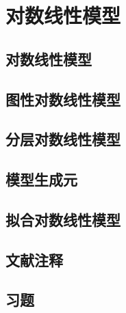 \chapter{对数线性模型}

\section{对数线性模型}

\pending

\section{图性对数线性模型}

\pending

\section{分层对数线性模型}

\pending

\section{模型生成元}

\pending

\section{拟合对数线性模型}

\pending

\section{文献注释}

\pending

\section{习题}

\pending
